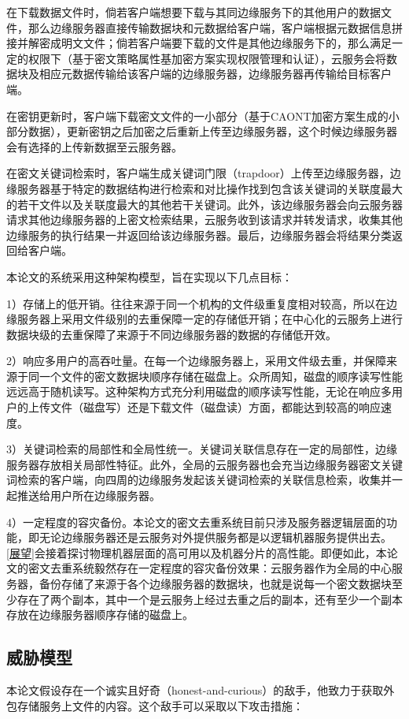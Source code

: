 \documentclass[promaster]{thesis-uestc}
\begin{document}
在下载数据文件时，倘若客户端想要下载与其同边缘服务下的其他用户的数据文件，那么边缘服务器直接传输数据块和元数据给客户端，客户端根据元数据信息拼接并解密成明文文件；倘若客户端要下载的文件是其他边缘服务下的，那么满足一定的权限下（基于密文策略属性基加密方案实现权限管理和认证），云服务会将数据块及相应元数据传输给该客户端的边缘服务器，边缘服务器再传输给目标客户端。

在密钥更新时，客户端下载密文文件的一小部分（基于CAONT加密方案生成的小部分数据），更新密钥之后加密之后重新上传至边缘服务器，这个时候边缘服务器会有选择的上传新数据至云服务器。

在密文关键词检索时，客户端生成关键词门限（trapdoor）上传至边缘服务器，边缘服务器基于特定的数据结构进行检索和对比操作找到包含该关键词的关联度最大的若干文件以及关联度最大的其他若干关键词。此外，该边缘服务器会向云服务器请求其他边缘服务器的上密文检索结果，云服务收到该请求并转发请求，收集其他边缘服务的执行结果一并返回给该边缘服务器。最后，边缘服务器会将结果分类返回给客户端。


本论文的系统采用这种架构模型，旨在实现以下几点目标：

1）存储上的低开销。往往来源于同一个机构的文件级重复度相对较高，所以在边缘服务器上采用文件级别的去重保障一定的存储低开销；在中心化的云服务上进行数据块级的去重保障了来源于不同边缘服务器的数据的存储低开效。

2）响应多用户的高吞吐量。在每一个边缘服务器上，采用文件级去重，并保障来源于同一个文件的密文数据块顺序存储在磁盘上。众所周知，磁盘的顺序读写性能远远高于随机读写。这种架构方式充分利用磁盘的顺序读写性能，无论在响应多用户的上传文件（磁盘写）还是下载文件（磁盘读）方面，都能达到较高的响应速度。

3）关键词检索的局部性和全局性统一。关键词关联信息存在一定的局部性，边缘服务器存放相关局部性特征。此外，全局的云服务器也会充当边缘服务器密文关键词检索的客户端，向四周的边缘服务发起该关键词检索的关联信息检索，收集并一起推送给用户所在边缘服务器。

4）一定程度的容灾备份。本论文的密文去重系统目前只涉及服务器逻辑层面的功能，即无论边缘服务器还是云服务对外提供服务都是以逻辑机器服务提供出去。\ref{展望}会接着探讨物理机器层面的高可用以及机器分片的高性能。即便如此，本论文的密文去重系统毅然存在一定程度的容灾备份效果：云服务器作为全局的中心服务器，备份存储了来源于各个边缘服务器的数据块，也就是说每一个密文数据块至少存在了两个副本，其中一个是云服务上经过去重之后的副本，还有至少一个副本存放在边缘服务器顺序存储的磁盘上。
\subsection{威胁模型}
本论文假设存在一个诚实且好奇（honest-and-curious）的敌手，他致力于获取外包存储服务上文件的内容。这个敌手可以采取以下攻击措施：
\end{document}

